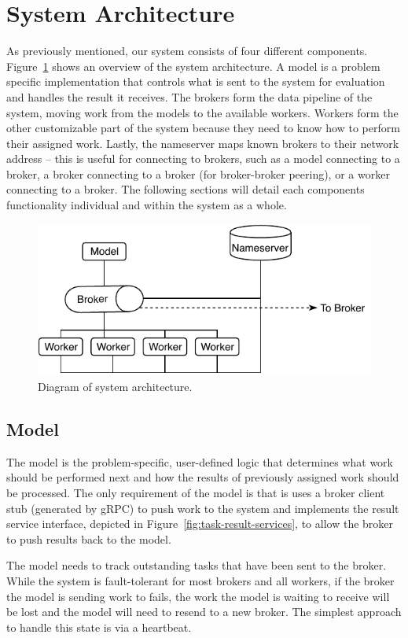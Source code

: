 \documentclass[conference]{IEEEtran}
\begin{document}
\section{System Architecture}
As previously mentioned, our system consists of four different components.
Figure~\ref{fig:sys-arch} shows an overview of the system architecture.  A model
is a problem specific implementation that controls what is sent to the system
for evaluation and handles the result it receives. The brokers form the data
pipeline of the system, moving work from the models to the available workers.
Workers form the other
customizable part of the system because they need to know how to perform their
assigned work.  Lastly, the nameserver maps known brokers to their network
address -- this is useful for connecting to brokers, such as a model connecting
to a broker, a broker connecting to a broker (for broker-broker peering), or a
worker connecting to a broker. The following sections will detail each
components functionality individual and within the system as a whole.

\begin{figure}
  \centering
  \includegraphics[width=.85\columnwidth]{img/system-arch.pdf}
  \caption{Diagram of system architecture.}
  \label{fig:sys-arch}
\end{figure}

\subsection{Model}
The model is the problem-specific, user-defined logic that determines what work
should be performed next and how the results of previously assigned work should
be processed. The only requirement of the model is that is uses a broker client
stub (generated by gRPC) to push work to the system and implements the result
service interface, depicted in Figure~\ref{fig:task-result-services}, to allow
the broker to push results back to the model.

The model needs to track outstanding tasks that have been sent to the broker.
While the system is fault-tolerant for most brokers and all workers, if the
broker the model is sending work to fails, the work the model is waiting to
receive will be lost and the model will need to resend to a new broker. The
simplest approach to handle this state is via a heartbeat.
\end{document}
